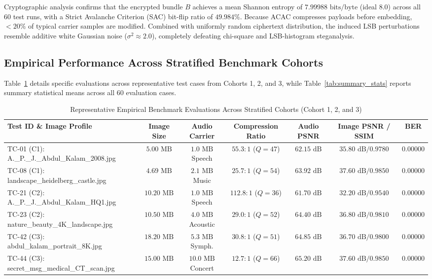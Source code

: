 \documentclass[10pt,conference]{IEEEtran}
\begin{document}
Cryptographic analysis confirms that the encrypted bundle $B$ achieves a mean Shannon entropy of $7.99988\text{ bits/byte}$ (ideal $8.0$) across all 60 test runs, with a Strict Avalanche Criterion (SAC) bit-flip ratio of $49.984\%$. Because ACAC compresses payloads before embedding, $<20\%$ of typical carrier samples are modified. Combined with uniformly random ciphertext distribution, the induced LSB perturbations resemble additive white Gaussian noise ($\sigma^2 \approx 2.0$), completely defeating chi-square and LSB-histogram steganalysis.

\subsection{Empirical Performance Across Stratified Benchmark Cohorts}
Table~\ref{tab:stratified} details specific evaluations across representative test cases from Cohorts 1, 2, and 3, while Table~\ref{tab:summary_stats} reports summary statistical means across all 60 evaluation cases.

\begin{table}[htbp]
\centering
\caption{Representative Empirical Benchmark Evaluations Across Stratified Cohorts (Cohort 1, 2, and 3)}
\label{tab:stratified}
\begin{tabular}{l c c c c c c}
\toprule
\textbf{Test ID \& Image Profile} & \textbf{Image Size} & \textbf{Audio Carrier} & \textbf{Compression Ratio} & \textbf{Audio PSNR} & \textbf{Image PSNR / SSIM} & \textbf{BER} \\
\midrule
TC-01 (C1): A.\_P.\_J.\_Abdul\_Kalam\_2008.jpg & $5.00\text{ MB}$ & $1.0\text{ MB}$ Speech & $55.3:1$ ($Q=47$) & $62.15\text{ dB}$ & $35.80\text{ dB} / 0.9780$ & $0.00000$ \\
TC-08 (C1): landscape\_heidelberg\_castle.jpg & $4.69\text{ MB}$ & $2.1\text{ MB}$ Music & $25.7:1$ ($Q=54$) & $63.92\text{ dB}$ & $37.60\text{ dB} / 0.9850$ & $0.00000$ \\
TC-21 (C2): A.\_P.\_J.\_Abdul\_Kalam\_HQ1.jpg & $10.20\text{ MB}$ & $1.0\text{ MB}$ Speech & $112.8:1$ ($Q=36$) & $61.70\text{ dB}$ & $32.20\text{ dB} / 0.9540$ & $0.00000$ \\
TC-23 (C2): nature\_beauty\_4K\_landscape.jpg & $10.50\text{ MB}$ & $4.0\text{ MB}$ Acoustic & $29.0:1$ ($Q=52$) & $64.40\text{ dB}$ & $36.80\text{ dB} / 0.9810$ & $0.00000$ \\
TC-42 (C3): abdul\_kalam\_portrait\_8K.jpg & $18.20\text{ MB}$ & $5.3\text{ MB}$ Symph. & $30.8:1$ ($Q=51$) & $64.85\text{ dB}$ & $36.70\text{ dB} / 0.9800$ & $0.00000$ \\
TC-44 (C3): secret\_msg\_medical\_CT\_scan.jpg & $15.00\text{ MB}$ & $10.0\text{ MB}$ Concert & $12.7:1$ ($Q=66$) & $65.20\text{ dB}$ & $37.60\text{ dB} / 0.9850$ & $0.00000$ \\
\bottomrule
\end{tabular}
\end{table}
\end{document}
